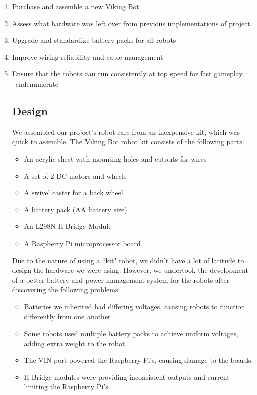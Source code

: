 \documentclass[a4paper,12pt]{article}
\begin{document}
	\begin{enumerate}
		\item Purchase and assemble a new Viking Bot
		\item Assess what hardware was left over from previous implementations of project
		\item Upgrade and standardize battery packs for all robots
		\item Improve wiring reliability and cable management
		\item Ensure that the robots can run consistently at top speed for fast gameplay	
\	end{enumerate}

\subsection{Design}
We assembled our project’s robot cars from an inexpensive kit, which was quick to assemble.  The Viking Bot robot kit consists of the following parts: 
	\begin{itemize}
		\item An acrylic sheet with mounting holes and cutouts for wires
		\item A set of 2 DC motors and wheels
		\item A swivel caster for a back wheel
		\item A battery pack (AA battery size)
		\item An L298N H-Bridge Module
		\item A Raspberry Pi microprocessor board
	\end{itemize}

Due to the nature of using a ``kit" robot, we didn’t have a lot of latitude to design the hardware we were using. However, we undertook the development of a better battery and power management system for the robots after discovering the following problems:

	\begin{itemize}
		\item Batteries we inherited had differing voltages, causing robots to function differently from one another
		\item Some robots used multiple battery packs to achieve uniform voltages, adding extra weight to the robot
		\item The VIN port powered the Raspberry Pi's, causing damage to the boards.
		\item H-Bridge modules were providing inconsistent outputs and current limiting the Raspberry Pi's
	\end{itemize}
	

\end{enumerate}
\end{document}
